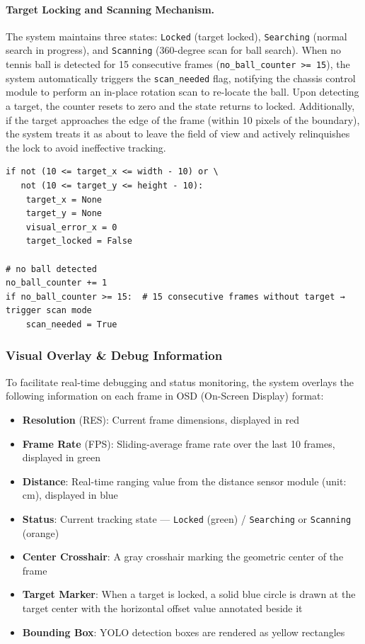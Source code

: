 \paragraph{Target Locking and Scanning Mechanism.} The system maintains three states: \texttt{Locked} (target locked), \texttt{Searching} (normal search in progress), and \texttt{Scanning} (360-degree scan for ball search). When no tennis ball is detected for 15 consecutive frames (\texttt{no\_ball\_counter >= 15}), the system automatically triggers the \texttt{scan\_needed} flag, notifying the chassis control module to perform an in-place rotation scan to re-locate the ball. Upon detecting a target, the counter resets to zero and the state returns to locked. Additionally, if the target approaches the edge of the frame (within 10 pixels of the boundary), the system treats it as about to leave the field of view and actively relinquishes the lock to avoid ineffective tracking.

\begin{verbatim}
if not (10 <= target_x <= width - 10) or \
   not (10 <= target_y <= height - 10):
    target_x = None
    target_y = None
    visual_error_x = 0
    target_locked = False

# no ball detected
no_ball_counter += 1
if no_ball_counter >= 15:  # 15 consecutive frames without target → trigger scan mode
    scan_needed = True
\end{verbatim}

\subsubsection{Visual Overlay \& Debug Information}
\label{sec:cv:osd}

To facilitate real-time debugging and status monitoring, the system overlays the following information on each frame in OSD (On-Screen Display) format:

\begin{itemize}
    \item \textbf{Resolution} (RES): Current frame dimensions, displayed in red
    \item \textbf{Frame Rate} (FPS): Sliding-average frame rate over the last 10 frames, displayed in green
    \item \textbf{Distance}: Real-time ranging value from the distance sensor module (unit: cm), displayed in blue
    \item \textbf{Status}: Current tracking state — \texttt{Locked} (green) / \texttt{Searching} or \texttt{Scanning} (orange)
    \item \textbf{Center Crosshair}: A gray crosshair marking the geometric center of the frame
    \item \textbf{Target Marker}: When a target is locked, a solid blue circle is drawn at the target center with the horizontal offset value annotated beside it
    \item \textbf{Bounding Box}: YOLO detection boxes are rendered as yellow rectangles
\end{itemize}

